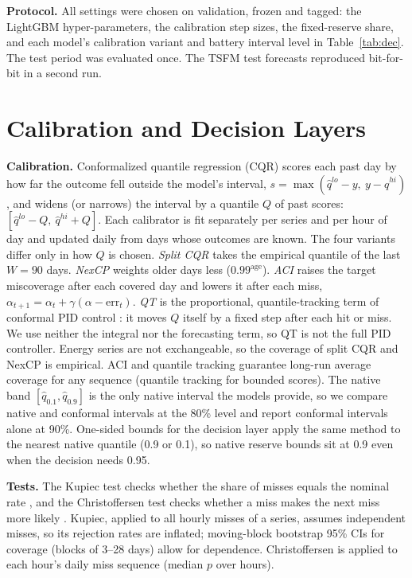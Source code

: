 \documentclass[conference]{IEEEtran}
\begin{document}
\textbf{Protocol.} All settings were chosen on validation, frozen and tagged: the LightGBM hyper-parameters, the calibration step sizes, the fixed-reserve share, and each model's calibration variant and battery interval level in Table~\ref{tab:dec}. The test period was evaluated once. The TSFM test forecasts reproduced bit-for-bit in a second run.

\section{Calibration and Decision Layers}
\textbf{Calibration.} Conformalized quantile regression (CQR) \cite{romano2019cqr} scores each past day by how far the outcome fell outside the model's interval, $s=\max(\hat q^{lo}-y,\ y-\hat q^{hi})$, and widens (or narrows) the interval by a quantile $Q$ of past scores: $[\hat q^{lo}-Q,\ \hat q^{hi}+Q]$. Each calibrator is fit separately per series and per hour of day and updated daily from days whose outcomes are known. The four variants differ only in how $Q$ is chosen. \emph{Split CQR} takes the empirical quantile of the last $W=90$ days. \emph{NexCP} \cite{barber2023nexcp} weights older days less ($0.99^{\text{age}}$). \emph{ACI} \cite{gibbs2021aci} raises the target miscoverage after each covered day and lowers it after each miss, $\alpha_{t+1}=\alpha_t+\gamma(\alpha-\text{err}_t)$. \emph{QT} is the proportional, quantile-tracking term of conformal PID control \cite{angelopoulos2023pid}: it moves $Q$ itself by a fixed step after each hit or miss. We use neither the integral nor the forecasting term, so QT is not the full PID controller. Energy series are not exchangeable, so the coverage of split CQR and NexCP is empirical. ACI and quantile tracking guarantee long-run average coverage for any sequence (quantile tracking for bounded scores). The native band $[\hat q_{0.1},\hat q_{0.9}]$ is the only native interval the models provide, so we compare native and conformal intervals at the 80\% level and report conformal intervals alone at 90\%. One-sided bounds for the decision layer apply the same method to the nearest native quantile (0.9 or 0.1), so native reserve bounds sit at 0.9 even when the decision needs 0.95.

\textbf{Tests.} The Kupiec test checks whether the share of misses equals the nominal rate \cite{kupiec1995}, and the Christoffersen test checks whether a miss makes the next miss more likely \cite{christoffersen1998}. Kupiec, applied to all hourly misses of a series, assumes independent misses, so its rejection rates are inflated; moving-block bootstrap 95\% CIs for coverage (blocks of 3--28 days) allow for dependence. Christoffersen is applied to each hour's daily miss sequence (median $p$ over hours).
\end{document}
